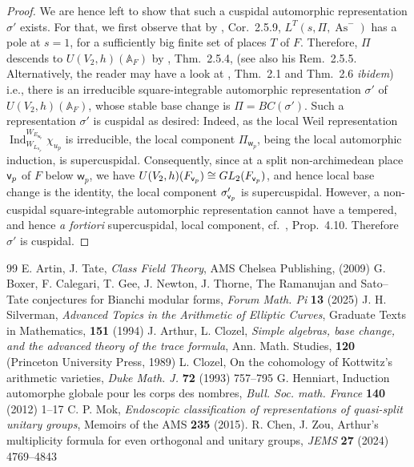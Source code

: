 \documentclass[10pt,a4paper]{amsart}
\def\A{\mathbb A}
\def\GL{{\rm GL}}
\def\vv{{\sf v}} %
\def\ww{\mathsf w}
\begin{document}
\begin{proof}
We are hence left to show that such a cuspidal automorphic representation $\sigma'$ exists. For that, we first observe that by \cite{mok}, Cor.\ 2.5.9, $L^T(s,\Pi,\operatorname{As}^{-})$ has a pole at $s=1$, for a sufficiently big finite set of places $T$ of $F$. Therefore, $\Pi$ descends to $U(V_2,h)(\A_F)$ by \cite{mok}, Thm.\ 2.5.4, (see also his Rem.\ 2.5.5. Alternatively, the reader may have a look at \cite{zou}, Thm.\ 2.1 and Thm.\ 2.6 {\it ibidem}) i.e., there is an irreducible square-integrable automorphic representation $\sigma'$ of $U(V_2,h)(\A_F)$, whose stable base change is $\Pi=BC(\sigma')$. Such a representation $\sigma'$ is cuspidal as desired: Indeed, as the local Weil representation $\operatorname{Ind}_{W_{L_{u_p}}}^{W_{E_{\ww_p}}}\chi_{u_p}$ is irreducible, the local component $\Pi_{\ww_p}$, being the local automorphic induction, is supercuspidal. Consequently, since at a split non-archimedean place \(\vv_p\) of \(F\) below \(\ww_p\), we have $U(V_2,h)(F_{\vv_p})\cong \GL_2(F_{\vv_p})$, and hence local base change is the identity, the local component \(\sigma'_{\vv_p}\) is supercuspidal. However, a non-cuspidal square-integrable automorphic representation cannot have a tempered, and hence {\it a fortiori} supercuspidal, local component, cf.\ \cite{clozel2}, Prop.\ 4.10. Therefore \(\sigma'\) is cuspidal.  
\end{proof}

\begin{thebibliography}{99}
 E. Artin, J. Tate, \emph{Class Field Theory}, AMS Chelsea Publishing, (2009)
 G. Boxer, F. Calegari, T. Gee, J. Newton, J. Thorne, The Ramanujan and Sato--Tate conjectures for Bianchi modular forms, {\it Forum Math. Pi} \textbf{13} (2025)
 J. H. Silverman, \emph{Advanced Topics in the Arithmetic of Elliptic Curves}, Graduate Texts in Mathematics, {\bf 151} (1994)
 J. Arthur, L. Clozel, {\it Simple algebras, base change, and the advanced theory of the trace formula}, Ann. Math. Studies, {\bf 120} (Princeton University Press, 1989)
 L. Clozel, On the cohomology of Kottwitz's arithmetic varieties, {\it Duke Math. J.} {\bf 72} (1993) 757--795
 G. Henniart, Induction automorphe globale pour les corps des nombres, {\it Bull. Soc. math. France} {\bf 140} (2012) 1--17
 C. P. Mok, {\it Endoscopic classification of representations of quasi-split unitary groups}, Memoirs of the AMS {\bf 235} (2015).
 R. Chen, J. Zou, Arthur's multiplicity formula for even orthogonal and unitary groups, {\it JEMS} {\bf 27} (2024) 4769--4843
\end{thebibliography}
\end{document}
